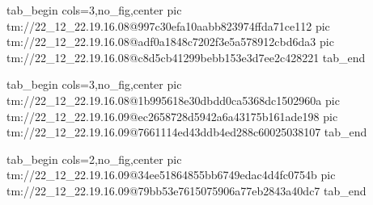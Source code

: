  
 
 
 
 

\qqSecCmtScr


\ifcmt
  tab_begin cols=3,no_fig,center
    pic tm://22_12_22.19.16.08@997c30efa10aabb823974ffda71ce112
    pic tm://22_12_22.19.16.08@adf0a1848c7202f3e5a578912cbd6da3
    pic tm://22_12_22.19.16.08@c8d5cb41299bebb153e3d7ee2c428221
  tab_end
\fi


\ifcmt
  tab_begin cols=3,no_fig,center
    pic tm://22_12_22.19.16.08@1b995618e30dbdd0ca5368dc1502960a
    pic tm://22_12_22.19.16.09@ec2658728d5942a6a43175b161ade198
    pic tm://22_12_22.19.16.09@7661114ed43ddb4ed288c60025038107
  tab_end
\fi


\ifcmt
  tab_begin cols=2,no_fig,center
    pic tm://22_12_22.19.16.09@34ee51864855bb6749edac4d4fc0754b
    pic tm://22_12_22.19.16.09@79bb53e7615075906a77eb2843a40dc7
  tab_end
\fi

